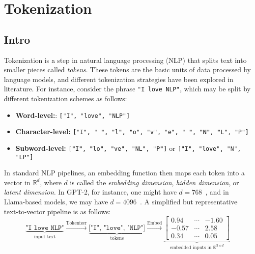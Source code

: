 %
\chapter{Tokenization}
%

\section{Intro}


Tokenization is a step in natural language processing (NLP) that splits text into smaller pieces called \textit{tokens}.
These tokens are the basic units of data processed by language models, and different tokenization strategies have been explored in literature.
For instance, consider the phrase \texttt{"I love NLP"}, which may be split by different tokenization schemes as follows:
\begin{itemize}
    \item \textbf{Word-level:}: \texttt{["I", "love", "NLP"]}

    \item \textbf{Character-level:} \texttt{["I", " ", "l", "o", "v", "e", " ", "N", "L", "P"]}

    \item \textbf{Subword-level:} \texttt{["I", "lo", "ve", "NL", "P"]} or \texttt{["I", "love", "N", "LP"]}

\end{itemize}
In standard NLP pipelines, an embedding function then maps each token into a vector in \(\mathbb{R}^{d}\), where \(d\) is called the \textit{embedding dimension}, \textit{hidden dimension}, or \textit{latent dimension}.
In GPT-2, for instance, one might have \(d = 768\)~\citep{radford2019language}, and in Llama-based models, we may have \(d = 4096\)~\citep{touvron2023llama}.
A simplified but representative text-to-vector pipeline is as follows:
\begin{equation*}
    \underbrace{\texttt{"I love NLP"}}_{\text{input text}}
    \xrightarrow{\text{Tokenizer}}
    \underbrace{\texttt{["I", "love", "NLP"]}}_{\text{tokens}}
    \xrightarrow{\text{Embed}}
    \underbrace{
    \begin{bmatrix}
        0.94 & \cdots & - 1.60 \\
        - 0.57 & \cdots & 2.58 \\
        0.34 & \cdots & 0.05
    \end{bmatrix}
}_{\text{embedded inputs in \(\mathbb{R}^{3 \times d}\)}}
\end{equation*}

